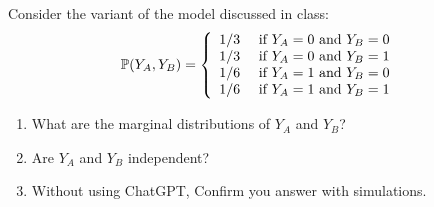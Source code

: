 \begin{exercise}
Consider the variant of the model discussed in class:
\begin{equation*}\label{eq:gene}
\mathbb P(Y_A,Y_B) = \left\{ \begin{array}{cc}
1/3 & \text{ if }Y_A=0 \text{ and } Y_B = 0\\
1/3 & \text{ if }Y_A=0 \text{ and } Y_B = 1\\
1/6 & \text{ if }Y_A=1 \text{ and } Y_B = 0\\
1/6 & \text{ if }Y_A=1 \text{ and } Y_B = 1\\
\end{array}
 \right.
\end{equation*}
\begin{enumerate}[label=(\alph*)]
\item What are the marginal distributions of $Y_A$ and $Y_B$?
\item Are $Y_A$ and $Y_B$ independent? 
\item Without using ChatGPT, Confirm you answer with simulations. 
\end{enumerate}
%

\end{exercise}


